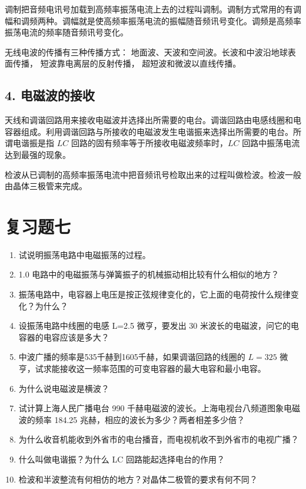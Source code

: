 调制把音频电讯号加载到高频率振荡电流上去的过程叫调制。调制方式常用的有调幅和调频两种。调幅就是使高频率振荡电流的振幅随音频讯号变化。调频是高频率振荡电流的频率随音频讯号变化。

无线电波的传播有三种传播方式：
地面波、天波和空间波。长波和中波沿地球表面传播，
短波靠电离层的反射传播， 超短波和微波以直线传播。

\subsection{4.
电磁波的接收}\label{ux7535ux78c1ux6ce2ux7684ux63a5ux6536-1}

天线和调谐回路用来接收电磁波并选择出所需要的电台。调谐回路由电感线圈和电容器组成。利用调谐回路与所接收的电磁波发生电谐振来选择出所需要的电台。所谓电谐振是指
\(LC\) 回路的固有频率等于所接收电磁波频率时，\(LC\)
回路中振荡电流达到最强的现象。

检波从已调制的高频率振荡电流中把音频讯号检取出来的过程叫做检波。检波一般由晶体三极管来完成。

\section{复习题七}\label{ux590dux4e60ux9898ux4e03}

\begin{enumerate}
\def\labelenumi{\arabic{enumi}.}
\item
  试说明振荡电路中电磁振荡的过程。
\item
  1.0 电路中的电磁振荡与弹簧振子的机械振动相比较有什么相似的地方？
\item
  振荡电路中，电容器上电压是按正弦规律变化的，它上面的电荷按什么规律变化？为什么？
\item
  设振荡电路中线圈的电感 L=2.5 微亨，要发出 30
  米波长的电磁波，问它的电容器的电容应该是多大？
\item
  中波广播的频率是535千赫到1605千赫，如果调谐回路的线圈的 \(L = 325\)
  微亨，试求能接收这一频率范围的可变电容器的最大电容和最小电容。
\item
  为什么说电磁波是横波？
\item
  试计算上海人民广播电台 990
  千赫电磁波的波长。上海电视台八频道图象电磁波的频率 184.25
  兆赫，相应的波长为多少？两者相差多少倍？
\item
  为什么收音机能收到外省市的电台播音，而电视机收不到外省市的电视广播？
\item
  什么叫做电谐振？为什么 LC 回路能起选择电台的作用？
\item
  检波和半波整流有何相仿的地方？对晶体二极管的要求有何不同？
\end{enumerate}


